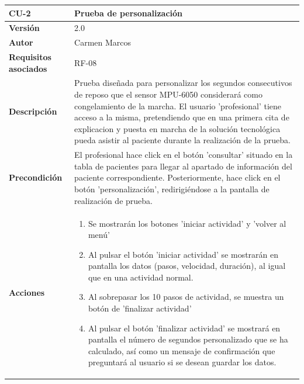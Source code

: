 \begin{table}[p]
	\centering
	\begin{tabularx}{\linewidth}{ p{} p{} }
		\toprule
		\textbf{CU-2}    & \textbf{Prueba de personalización}\\
		\toprule
		\textbf{Versión}              & 2.0    \\
		\textbf{Autor}                & Carmen Marcos \\
		\textbf{Requisitos asociados} & RF-08\\
		\textbf{Descripción}          & Prueba diseñada para personalizar los segundos consecutivos de reposo que el sensor MPU-6050 considerará como congelamiento de la marcha. El usuario 'profesional' tiene acceso a la misma, pretendiendo que en una primera cita de explicacion y puesta en marcha de la solución tecnológica pueda asistir al paciente durante la realización de la prueba. 
        \\
		\textbf{Precondición}         & El profesional hace click en el botón 'consultar' situado en la tabla de pacientes para llegar al apartado de información del paciente correspondiente. Posteriormente, hace click en el botón 'personalización', redirigiéndose a la pantalla de realización de prueba.
		\\
		\textbf{Acciones}             & \begin{enumerate} \def\labelenumi{\arabic{enumi}.}
	\tightlist
		\item Se mostrarán los botones 'iniciar actividad' y 'volver al menú'
        \item Al pulsar el botón 'iniciar actividad' se mostrarán en pantalla los datos (pasos, velocidad, duración), al igual que en una actividad normal.
        \item Al sobrepasar los 10 pasos de actividad, se muestra un botón de 'finalizar actividad'%
        \item Al pulsar el botón 'finalizar actividad' se mostrará en pantalla el número de segundos personalizado que se ha calculado, así como un mensaje de confirmación que preguntará al usuario si se desean guardar los datos.

\end{enumerate}
\end{tabularx}
\end{table}
